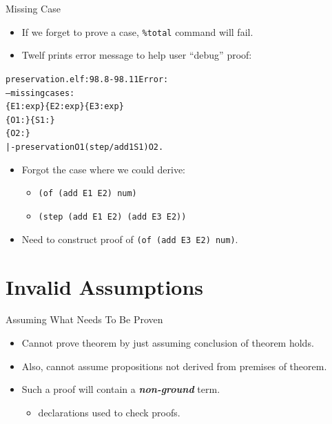 \documentclass{beamer}
\renewcommand{\emph}[1]{\textbf{\textit{#1}}}
\begin{document}
\begin{frame}[containsverbatim]{Missing Case}
\begin{itemize}
\item If we forget to prove a case, \texttt{\%total} command
will fail.
\item Twelf prints error message to help user ``debug'' proof:
\end{itemize}

\begin{alltt}
preservation.elf:98.8-98.11 Error: 
 --- missing cases:
\{E1:exp\} \{E2:exp\} \{E3:exp\}
\{O1:\} \{S1:\}
\{O2:\}
   |- preservation O1 (step/add1 S1) O2.
\end{alltt}

\begin{itemize}
\item Forgot the case where we could derive:
  \begin{itemize}
  \item \texttt{(of (add E1 E2) num)}
  \item \texttt{(step (add E1 E2) (add E3 E2))}
  \end{itemize}
\item Need to construct proof of \texttt{(of (add E3 E2) num)}.
\end{itemize}
\end{frame}


\section{Invalid Assumptions}

\begin{frame}{Assuming What Needs To Be Proven}
\begin{itemize}
\item Cannot prove theorem by just assuming conclusion
of theorem holds.

\pause
\item Also, cannot assume propositions not derived from premises
of theorem.

\pause
\item Such a proof will contain a \emph{non-ground} term.
  \begin{itemize}
  \item \texttt{} declarations used to check proofs.
  \end{itemize}
\end{itemize}
\end{frame}
\end{document}

